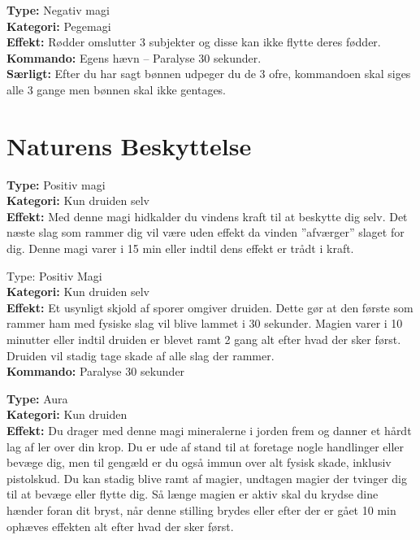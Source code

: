 \begin{jord*}
\textbf{Type:} Negativ magi\\ 
\textbf{Kategori:} Pegemagi\\
\textbf{Effekt:} Rødder omslutter 3 subjekter og disse kan ikke flytte deres fødder.\\
\textbf{Kommando:} Egens hævn – Paralyse 30 sekunder.\\
\textbf{Særligt:} Efter du har sagt bønnen udpeger du de 3 ofre, kommandoen skal siges alle 3 gange men bønnen skal ikke gentages.
\end{jord*}
\newpage
\section{Naturens Beskyttelse}

\begin{nBeskyt*}
\textbf{Type:} Positiv magi\\ 
\textbf{Kategori:} Kun druiden selv\\
\textbf{Effekt:} Med denne magi hidkalder du vindens kraft til at beskytte dig selv. Det næste slag som rammer dig vil være uden effekt da vinden ”afværger” slaget for dig. Denne magi varer i 15 min eller indtil dens effekt er trådt i kraft.
\end{nBeskyt*}

\begin{nBeskyt*}[Pollenskjold]
Type: Positiv Magi  \\
\textbf{Kategori:} Kun druiden selv\\
\textbf{Effekt:} Et usynligt skjold af sporer omgiver druiden. Dette gør at den første som rammer ham med fysiske slag vil blive lammet i 30 sekunder. Magien varer i 10 minutter eller indtil druiden er blevet ramt 2 gang alt efter hvad der sker først. Druiden vil stadig tage skade af alle slag der rammer.\\
\textbf{Kommando:} Paralyse 30 sekunder
\end{nBeskyt*}

\begin{nBeskyt*}[Lerform]
\textbf{Type:} Aura\\ 
\textbf{Kategori:} Kun druiden\\
\textbf{Effekt:} Du drager med denne magi mineralerne i jorden frem og danner et hårdt lag af ler over din krop. Du er ude af stand til at foretage nogle handlinger eller bevæge dig, men til gengæld er du også immun over
alt fysisk skade, inklusiv pistolskud. Du kan stadig blive ramt af magier, undtagen magier der tvinger dig til at bevæge eller flytte dig. Så længe magien er aktiv skal du krydse dine hænder foran dit bryst, når denne stilling brydes eller efter der er gået 10 min ophæves effekten alt efter hvad der sker først.
\end{nBeskyt*}

